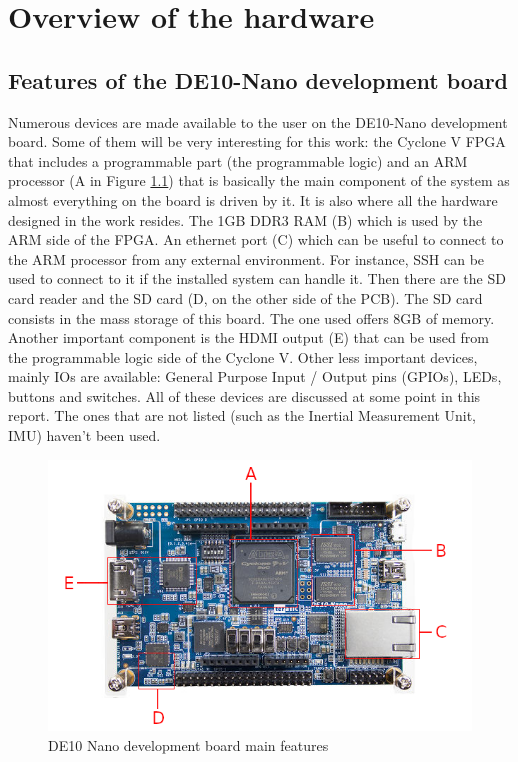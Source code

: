 \chapter{Overview of the hardware}

\section{Features of the DE10-Nano development board}

Numerous devices are made available to the user on the DE10-Nano development board. Some of them will be very 
interesting for this work: the Cyclone V FPGA that includes a programmable part (the programmable 
logic) and an ARM processor (A in Figure \ref{fig:de10/de10_features}) that is
basically the main component of the system as almost everything on the board is driven by it. It is
also where all the hardware designed in the work resides. The 1GB DDR3 RAM (B) which is used 
by the ARM side of the FPGA. An ethernet port (C) which can be
useful to connect to the ARM processor from any external environment. For instance, SSH can be used
to connect to it if the installed system can handle it. Then there are the SD card reader and the SD 
card (D, on the other side of the PCB). The SD card consists in the mass storage of this board. The
one used offers 8GB of memory. Another important component is the HDMI output (E) that can be used
from the programmable logic side of the Cyclone V. Other less important devices, mainly IOs are 
available: General Purpose Input / Output pins (GPIOs), LEDs, buttons and switches. All of these 
devices are discussed at some point in this report. The ones that are not listed (such as the Inertial
Measurement Unit, IMU) haven't been used.

\begin{figure}[H]
    \centering
    \includegraphics[scale=0.5]{Chapter1-Hardware/res/de10_nano.png}
    \caption{DE10 Nano development board main features}
    \label{fig:de10/de10_features}
\end{figure}

